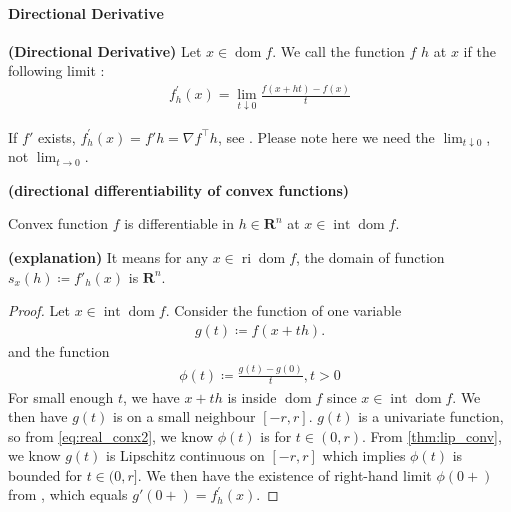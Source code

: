 \documentclass{article}
\newcommand{\bfs}[1]{\textbf{({#1}) }}
\newcommand{\ri}{\operatorname{ri}}
\newcommand{\inte}{\operatorname{int}}
\newcommand{\dom}{\operatorname{dom}}
\begin{document}
\paragraph{Directional Derivative}
\begin{defa}\bfs{Directional Derivative}\label{def:dir_deri}
 Let $x \in \dom f$. We call the function $f$  $h$ at $x$ if the following limit :
\begin{align*}
f_{h}^{\prime}(x)=\lim _{t \downarrow 0} \frac{f(x+h t)-f(x)}{t}
\end{align*}
\end{defa}
\begin{rema}\label{rem:vcxaa}
If $f'$ exists, $f_{h}^{\prime}(x)=f'h=\nabla f^{\top} h$, see \cite[Page 217 (39)]{rudin1976principles}. Please note here we need the   $\lim _{t \downarrow 0}$, not $\lim _{t \to 0}$.
\end{rema}
\begin{thma}\bfs{directional differentiability of convex functions}$\quad$

Convex function $f$ is differentiable in  $h \in \mathbf{R}^{n}$ at  $x \in\inte \dom  f$.
\end{thma}
\begin{rema}\bfs{explanation}\label{re:cas}
It means for any $x\in \ri \dom f$, the domain of function $s_x(h)\coloneqq f'_h(x)$ is $\mathbf{R}^n$.
\end{rema}
\begin{proof}\color{ForestGreen}
Let $x \in\inte \dom f$. Consider the function of one variable
\begin{align}
g(t)\coloneqq f(x+t h). \label{eq:ffbaccac}
\end{align}
and the function
\begin{align}
\phi(t)\coloneqq \frac{g(t)-g(0)}{t}, t>0 \label{eq:ffbac1}
\end{align}
For small enough $t$, we have $x+t h$ is inside $\dom f$ since $x\in \inte \dom f$. We then have $g(t)$ is  on a small neighbour $[-r,r]$. $g(t)$ is a univariate function, so from \cref{eq:real_conx2}, we know $\phi(t)$ is  for $t\in (0,r)$. From \cref{thm:lip_conv}, we know $g(t)$ is Lipschitz continuous on $[-r,r]$ which implies $\phi(t)$ is bounded for $t\in (0,r]$. We then have the existence of right-hand limit $\phi(0+)$ from  \cite[Theorem 4.29]{rudin1976principles}, which equals $g'(0+)=f_{h}^{\prime}(x)$.
\end{proof}
\end{document}
